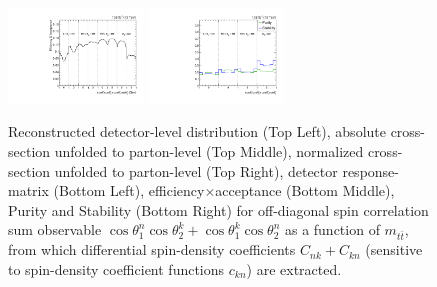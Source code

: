 \begin{figure}[htb]
\begin{center}
 \includegraphics[width=0.32\textwidth]{fig_fullRun2UL/unfolding/combined/TotEff_c_Pnk_mttbar.pdf}
 \includegraphics[width=0.32\textwidth]{fig_fullRun2UL/unfolding/combined/PurStab_c_Pnk_mttbar.pdf} \\
\caption{Reconstructed detector-level distribution (Top Left), absolute cross-section unfolded to parton-level (Top Middle), normalized cross-section unfolded to parton-level (Top Right), detector response-matrix (Bottom Left), efficiency$\times$acceptance (Bottom Middle), Purity and Stability (Bottom Right) for off-diagonal spin correlation sum observable $\cos\theta_{1}^{n}\cos\theta_{2}^{k}+\cos\theta_{1}^{k}\cos\theta_{2}^{n}$ as a function of $m_{t\bar{t}}$, from which differential spin-density coefficients $C_{nk}+C_{kn}$ (sensitive to spin-density coefficient functions $c_{k n}$) are extracted.}
\label{fig:c_Pnk_mttbar}
\end{center}
\end{figure}
\clearpage
